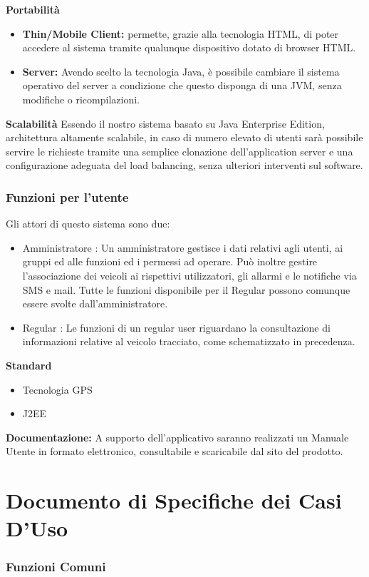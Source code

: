 \documentclass[a4paper,12pt]{beamer}
\begin{document}
\begin{frame}
\textbf{Portabilità}
\begin{itemize}
\item \textbf{Thin/Mobile Client:} permette, grazie alla tecnologia HTML, di poter accedere al sistema tramite qualunque dispositivo dotato di browser HTML.
\item \textbf{Server:} Avendo scelto la tecnologia Java, è possibile cambiare il sistema operativo del server a condizione che questo disponga di una JVM, senza modifiche o ricompilazioni.
\end{itemize}
\textbf{Scalabilità}
Essendo il nostro sistema basato su Java Enterprise Edition, architettura altamente scalabile, in caso di numero elevato di utenti sarà possibile servire le richieste tramite una semplice clonazione dell'application server e una configurazione adeguata del load balancing, senza ulteriori interventi sul software.
\pagebreak
\end{frame}

\begin{frame}
\frametitle{Funzioni per l'utente}
Gli attori di questo sistema sono due:
\begin{itemize}
\item Amministratore : Un amministratore gestisce i dati relativi agli utenti, ai gruppi ed alle funzioni ed i permessi ad operare. Può inoltre gestire l'associazione dei veicoli ai rispettivi utilizzatori, gli allarmi e le notifiche via SMS e mail. Tutte le funzioni disponibile per il Regular possono comunque essere svolte dall'amministratore.
\item Regular : Le funzioni di un regular user riguardano la consultazione di informazioni relative al veicolo tracciato, come schematizzato in precedenza.
\end{itemize}

\textbf{Standard}
\begin{itemize}
\item Tecnologia GPS
\item J2EE
\end{itemize}

\textbf{Documentazione:} A supporto dell'applicativo saranno realizzati un Manuale Utente in formato elettronico, consultabile e scaricabile dal sito del prodotto.
\end{frame}
\pagebreak

\section{Documento di Specifiche dei Casi D'Uso}
\begin{frame}
\frametitle{Funzioni Comuni}
\begin{center}
\end{center}
\end{frame}
\end{document}
